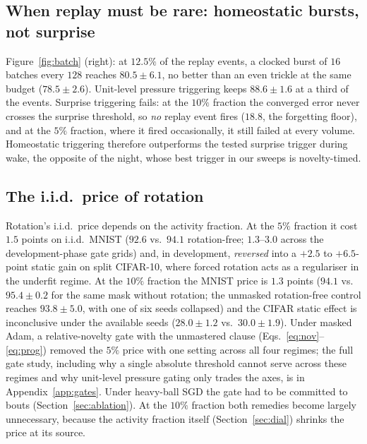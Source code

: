 \documentclass{article}
\begin{document}
\subsection{When replay must be rare: homeostatic bursts, not surprise}
Figure~\ref{fig:batch} (right): at $12.5\%$ of the replay events, a clocked burst of $16$
batches every $128$ reaches $80.5\pm6.1$, no better than an even trickle at the same budget
($78.5\pm2.6$). Unit-level pressure triggering keeps $88.6\pm1.6$ at a third of the events.
Surprise triggering fails: at the $10\%$ fraction the converged error never crosses the
surprise threshold, so \emph{no} replay event fires ($18.8$, the forgetting floor), and at
the $5\%$ fraction, where it fired occasionally, it still failed at every volume. Homeostatic
triggering therefore outperforms the tested surprise trigger during wake, the opposite of the
night, whose best trigger in our sweeps is novelty-timed.

\subsection{The i.i.d.\ price of rotation}
Rotation's i.i.d.\ price depends on the activity fraction. At the $5\%$ fraction it cost
$1.5$ points on i.i.d.\ MNIST ($92.6$ vs.\ $94.1$ rotation-free; $1.3$--$3.0$ across the
development-phase gate grids) and, in development, \emph{reversed} into a $+2.5$ to
$+6.5$-point static gain on split CIFAR-10, where forced rotation acts as a regulariser in
the underfit regime. At the $10\%$ fraction the MNIST price is $1.3$ points ($94.1$ vs.\
$95.4\pm0.2$ for the same mask without rotation; the unmasked rotation-free control
reaches $93.8\pm5.0$, with one of six seeds collapsed) and the CIFAR static effect is
inconclusive under the available seeds ($28.0\pm1.2$ vs.\ $30.0\pm1.9$). Under masked Adam,
a relative-novelty
gate with the unmastered clause (Eqs.~\eqref{eq:nov}--\eqref{eq:prog}) removed the $5\%$
price with one setting across all four regimes; the full gate study, including why a single
absolute threshold cannot serve across these regimes and why unit-level pressure gating only
trades the axes, is in Appendix~\ref{app:gates}. Under heavy-ball SGD the gate had to be
committed to bouts (Section~\ref{sec:ablation}). At the $10\%$ fraction both remedies become
largely unnecessary, because the activity fraction itself (Section~\ref{sec:dial}) shrinks
the price at its source.
\end{document}
